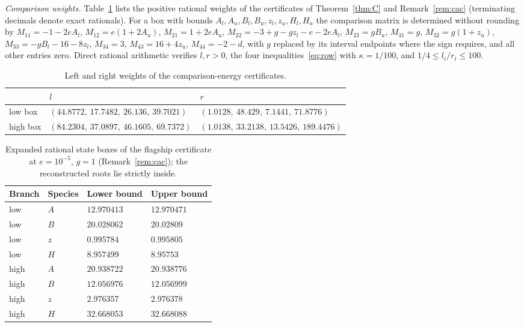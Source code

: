 \documentclass[11pt,a4paper]{article}
\theoremstyle{plain}
\theoremstyle{definition}
\theoremstyle{remark}
\begin{document}
\emph{Comparison weights.} Table~\ref{tab:weights} lists the positive rational weights of the certificates of Theorem~\ref{thm:C} and Remark~\ref{rem:cac} (terminating decimals denote exact rationals). For a box with bounds $A_l,A_u,B_l,B_u,z_l,z_u,H_l,H_u$ the comparison matrix is determined without rounding by $M_{11}=-1-2eA_l$, $M_{12}=e(1+2A_u)$, $M_{21}=1+2eA_u$, $M_{22}=-3+g-gz_l-e-2eA_l$, $M_{23}=gB_u$, $M_{31}=g$, $M_{32}=g(1+z_u)$, $M_{33}=-gB_l-16-8z_l$, $M_{34}=3$, $M_{43}=16+4z_u$, $M_{44}=-2-d$, with $g$ replaced by its interval endpoints where the sign requires, and all other entries zero. Direct rational arithmetic verifies $l,r>0$, the four inequalities~\eqref{eq:row} with $\kappa=1/100$, and $1/4\le l_i/r_i\le100$.

\begin{table}[htb]\centering\small
\begin{tabular}{@{}lll@{}}\toprule
 & $l$ & $r$\\\midrule
low box & $(44.8772,\ 17.7482,\ 26.136,\ 39.7021)$ & $(1.0128,\ 48.429,\ 7.1441,\ 71.8776)$\\
high box & $(84.2304,\ 37.0897,\ 46.1605,\ 69.7372)$ & $(1.0138,\ 33.2138,\ 13.5426,\ 189.4476)$\\\bottomrule
\end{tabular}
\caption{Left and right weights of the comparison-energy certificates.}\label{tab:weights}
\end{table}

\begin{table}[htb]\centering\small
\begin{tabular}{@{}llll@{}}\toprule
Branch & Species & Lower bound & Upper bound\\\midrule
low & $A$ & $12.970413$ & $12.970471$\\
low & $B$ & $20.028062$ & $20.02809$\\
low & $z$ & $0.995784$ & $0.995805$\\
low & $H$ & $8.957499$ & $8.95753$\\
high & $A$ & $20.938722$ & $20.938776$\\
high & $B$ & $12.056976$ & $12.056999$\\
high & $z$ & $2.976357$ & $2.976378$\\
high & $H$ & $32.668053$ & $32.668088$\\\bottomrule
\end{tabular}
\caption{Expanded rational state boxes of the flagship certificate at $e=10^{-5}$, $g=1$ (Remark~\ref{rem:cac}); the reconstructed roots lie strictly inside.}\label{tab:cacboxes}
\end{table}
\end{document}
